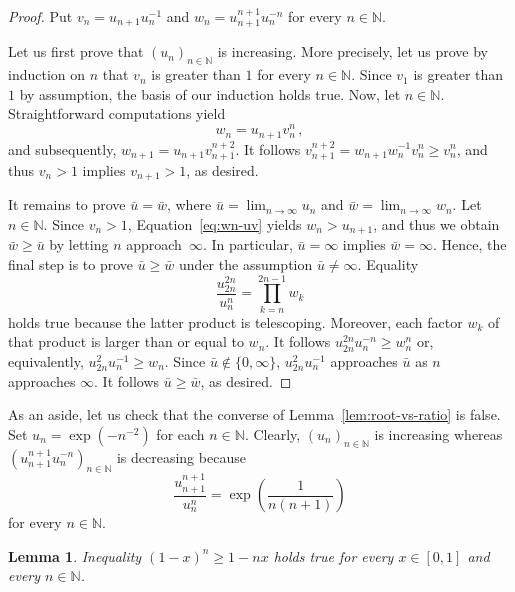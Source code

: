 \documentclass[12pt]{article}
\newcommand{\bN}{\mathbb{N}} %
\newtheorem{lemma}{Lemma}
\begin{document}
\begin{proof}
 Put
  $v_n = u_{n + 1} u_n^{-1}$
  and
  $w_n = u_{n + 1}^{n + 1} u_n^{- n}$
  for every $n \in \bN$.
  
  Let us first prove that $\left( u_n \right)_{n \in \bN}$ is increasing.
  More precisely, let us prove by induction on $n$ that $v_n$ is greater than $1$ for every $n \in \bN$.
  Since $v_1$ is greater than $1$ by assumption,
  the basis of our induction holds true.
  Now, let $n \in \bN$. %
  Straightforward computations yield
  \begin{equation} \label{eq:wn-uv}
    w_n = u_{n + 1}v_n^n \,, 
  \end{equation} 
  and subsequently, 
  $w_{n + 1} = u_{n + 1} v_{n + 1}^{n + 2}$.
  It follows  
  $v_{n + 1}^{n + 2}= w_{n + 1}w_n^{-1} v_n^n \ge v_n^n$,
  and thus $v_n > 1$ implies $v_{n + 1} > 1$, as desired.

  It remains to prove $\bar u = \bar w$, where 
  $\bar u = \lim_{n \to \infty} u_n$ and 
  $\bar w = \lim_{n \to \infty} w_n$.
  Let $n \in \bN$.
  Since $v_n > 1$,
  Equation~\eqref{eq:wn-uv} yields $w_n > u_{n + 1}$,
  and thus we obtain $\bar w \ge \bar u$ by letting $n$ approach~$\infty$.
  In particular, $\bar u = \infty$ implies $\bar w = \infty$.
  Hence, the final step is to prove $\bar u \ge \bar w$ under the assumption $\bar u \ne \infty$.
  Equality 
  $$
  \frac{u_{2n}^{2n}}{ u_n^n} =  \prod_{k = n}^{2n - 1} w_k
  $$
  holds true because the latter product is telescoping.
  Moreover, each factor $w_k$ of that product is larger than or equal to $w_n$.
  It follows 
  $u_{2n}^{2n} u_n^{-n} \ge w_n^n$ 
  or, equivalently,
  $u_{2n}^2u_n^{- 1}  \ge  w_n$.
  Since $\bar u \notin \{ 0, \infty \}$, 
  $u_{2n}^2 u_n^{-1}$ approaches $\bar u$ as $n$ approaches $\infty$.
  It follows $\bar u \ge \bar w$, as desired.
\end{proof}

As an aside, let us check that the converse of Lemma~\ref{lem:root-vs-ratio} is false.
Set $ u_n = \exp \left( - n^{- 2} \right)$ for each $n \in \bN$.
Clearly,  $\left( u_n \right)_{n \in \bN}$  is increasing whereas
$\left(  u_{n + 1}^{n + 1}  u_n^{-n} \right)_{n \in \bN}$ is decreasing because 
$$
\frac{u_{n + 1}^{n + 1}}{u_n^n} = \exp \left(\frac{1}{n (n + 1)} \right) 
$$
for every $n \in \bN$.

\begin{lemma} \label{lem:Bernoulli}
   Inequality ${(1 - x)}^n \ge  1 - n x$ 
   holds true for every $x \in [0, 1]$ and every $n \in \bN$.
\end{lemma} 
\end{document}
